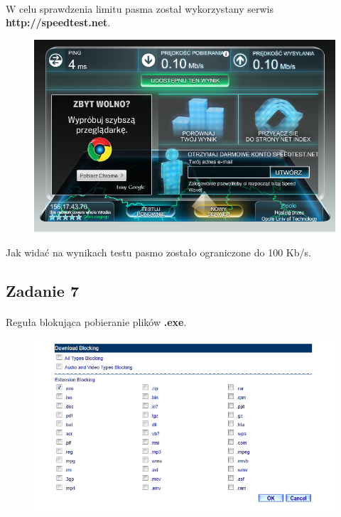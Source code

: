 \documentclass[wide,a4paper,titlepage,12pt] {article}
\begin{document}
  \paragraph{}
  W celu sprawdzenia limitu pasma został wykorzystany serwis \textbf{http://speedtest.net}.
  \begin{figure}[h!]
    \begin{center}
      \includegraphics[width=\textwidth]{7.PNG}
    \end{center}
  \end{figure}

  Jak widać na wynikach testu pasmo zostało ograniczone do 100 Kb/s.

  \newpage

  \subsection{Zadanie 7}
  \paragraph{}
  Reguła blokująca pobieranie plików \textbf{.exe}.
  \begin{figure}[h!]
    \begin{center}
      \includegraphics[width=\textwidth]{blocking_exe.PNG}
    \end{center}
  \end{figure}
\end{document}
